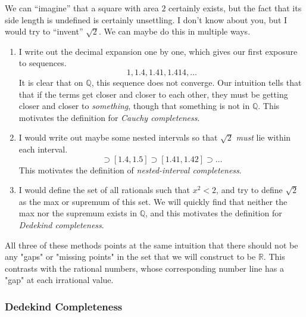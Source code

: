 \documentclass{article}
\begin{document}
      We can ``imagine'' that a square with area $2$ certainly exists, but the fact that its side length is undefined is certainly unsettling. I don't know about you, but I would try to ``invent'' $\sqrt{2}$. We can maybe do this in multiple ways. 
      \begin{enumerate}
        \item I write out the decimal expansion one by one, which gives our first exposure to sequences. 
        \begin{equation}
          1, 1.4, 1.41, 1.414, \ldots
        \end{equation} 
        It is clear that on $\mathbb{Q}$, this sequence does not converge. Our intuition tells that that if the terms get closer and closer to each other, they must be getting closer and closer to \textit{something}, though that something is not in $\mathbb{Q}$. This motivates the definition for \textit{Cauchy completeness}. 

        \item I would write out maybe some nested intervals so that $\sqrt{2}$ \textit{must}  lie within each interval. 
        \begin{equation}
          [1, 2] \supset [1.4, 1.5] \supset [1.41, 1.42] \supset \ldots 
        \end{equation}
        This motivates the definition of \textit{nested-interval completeness}. 

        \item I would define the set of all rationals such that $x^2 < 2$, and try to define $\sqrt{2}$ as the max or supremum of this set. We will quickly find that neither the max nor the supremum exists in $\mathbb{Q}$, and this motivates the definition for \textit{Dedekind completeness}. 
      \end{enumerate}

      All three of these methods points at the same intuition that there should not be any "gaps" or "missing points" in the set that we will construct to be $\mathbb{R}$. This contrasts with the rational numbers, whose corresponding number line has a "gap" at each irrational value. 

    \subsubsection{Dedekind Completeness} 
\end{document}

